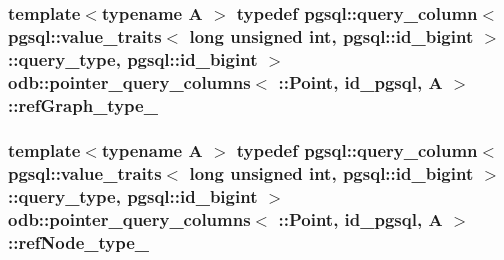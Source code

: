 \subsubsection[{ref\+Graph\+\_\+type\+\_\+}]{\setlength{\rightskip}{0pt plus 5cm}template$<$typename A $>$ typedef pgsql\+::query\+\_\+column$<$ pgsql\+::value\+\_\+traits$<$ long unsigned int, pgsql\+::id\+\_\+bigint $>$\+::query\+\_\+type, pgsql\+::id\+\_\+bigint $>$ odb\+::pointer\+\_\+query\+\_\+columns$<$ \+::{\bf Point}, id\+\_\+pgsql, A $>$\+::{\bf ref\+Graph\+\_\+type\+\_\+}}\label{structodb_1_1pointer__query__columns_3_01_1_1_point_00_01id__pgsql_00_01_a_01_4_a613de48a47de6c39f97cd5541b8df5f6}
\hypertarget{structodb_1_1pointer__query__columns_3_01_1_1_point_00_01id__pgsql_00_01_a_01_4_ad19ee7a02f58090dd097ab1b5540bf45}{}
\subsubsection[{ref\+Node\+\_\+type\+\_\+}]{\setlength{\rightskip}{0pt plus 5cm}template$<$typename A $>$ typedef pgsql\+::query\+\_\+column$<$ pgsql\+::value\+\_\+traits$<$ long unsigned int, pgsql\+::id\+\_\+bigint $>$\+::query\+\_\+type, pgsql\+::id\+\_\+bigint $>$ odb\+::pointer\+\_\+query\+\_\+columns$<$ \+::{\bf Point}, id\+\_\+pgsql, A $>$\+::{\bf ref\+Node\+\_\+type\+\_\+}}\label{structodb_1_1pointer__query__columns_3_01_1_1_point_00_01id__pgsql_00_01_a_01_4_ad19ee7a02f58090dd097ab1b5540bf45}
\hypertarget{structodb_1_1pointer__query__columns_3_01_1_1_point_00_01id__pgsql_00_01_a_01_4_a5e9f6d30d27a826d7ad60ce86c6fc70d}{}

